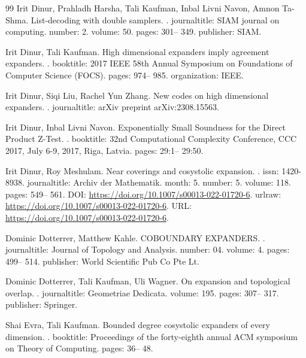 \documentclass[10pt,a4paper]{article}
\theoremstyle{definition}
\theoremstyle{remark}
\numberwithin{equation}{section}
\begin{document}
\begin{thebibliography}{99}
Irit Dinur, Prahladh Harsha, Tali Kaufman, Inbal Livni Navon, Amnon Ta-Shma.
\newblock List-decoding with double samplers.
.
\newblock journaltitle: SIAM journal on computing.
\newblock number: 2.
\newblock volume: 50.
\newblock pages: 301-- 349.
\newblock publisher: SIAM.

Irit Dinur, Tali Kaufman.
\newblock High dimensional expanders imply agreement expanders.
.
\newblock booktitle: 2017 IEEE 58th Annual Symposium on Foundations of Computer Science (FOCS).
\newblock pages: 974-- 985.
\newblock organization: IEEE.

Irit Dinur, Siqi Liu, Rachel Yun Zhang.
\newblock New codes on high dimensional expanders.
.
\newblock journaltitle: arXiv preprint arXiv:2308.15563.

Irit Dinur, Inbal {Livni Navon}.
\newblock Exponentially Small Soundness for the Direct Product Z-Test.
.
\newblock booktitle: 32nd Computational Complexity Conference, {CCC} 2017, July 6-9, 2017, Riga, Latvia.
\newblock pages: 29:1-- 29:50.

Irit Dinur, Roy Meshulam.
\newblock Near coverings and cosystolic expansion.
.
\newblock issn: 1420-8938.
\newblock journaltitle: Archiv der Mathematik.
\newblock month: 5.
\newblock number: 5.
\newblock volume: 118.
\newblock pages: 549-- 561.
\newblock DOI: \url{https://doi.org/10.1007/s00013-022-01720-6}.
\newblock urlraw: \url{https://doi.org/10.1007/s00013-022-01720-6}.
\newblock URL: \url{https://doi.org/10.1007/s00013-022-01720-6}.

Dominic Dotterrer, Matthew Kahle.
\newblock COBOUNDARY EXPANDERS.
.
\newblock journaltitle: Journal of Topology and Analysis.
\newblock number: 04.
\newblock volume: 4.
\newblock pages: 499-- 514.
\newblock publisher: World Scientific Pub Co Pte Lt.

Dominic Dotterrer, Tali Kaufman, Uli Wagner.
\newblock On expansion and topological overlap.
.
\newblock journaltitle: Geometriae Dedicata.
\newblock volume: 195.
\newblock pages: 307-- 317.
\newblock publisher: Springer.

Shai Evra, Tali Kaufman.
\newblock Bounded degree cosystolic expanders of every dimension.
.
\newblock booktitle: Proceedings of the forty-eighth annual ACM symposium on Theory of Computing.
\newblock pages: 36-- 48.


\end{thebibliography}
\end{document}
